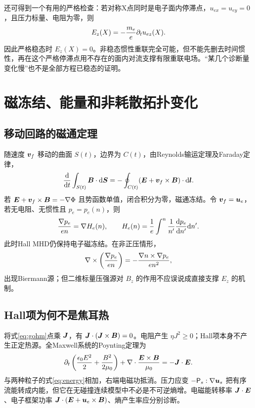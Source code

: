 还可得到一个有用的严格检查：若对称X点同时是电子面内停滞点，$u_{ex}=u_{ey}=0$，且压力标量、电阻为零，则
\begin{equation}E_z(X)=-{m_e\over e}\partial_tu_{ez}(X).
\end{equation}
因此严格稳态时 $E_z(X)=0$。非稳态惯性重联完全可能，但不能先删去时间惯性，再在这个严格停滞点用不存在的面内对流支撑有限重联电场。“某几个诊断量变化慢”也不是全部方程已稳态的证明。



\section{磁冻结、能量和非耗散拓扑变化}
\subsection{移动回路的磁通定理}
随速度 $\bm{v}_f$ 移动的曲面 $S(t)$，边界为 $C(t)$，由Reynolds输运定理及Faraday定律，
\begin{equation}{\mathrm d\over\mathrm dt}\int_{S(t)}\bm{B}\cdot\mathrm d\bm{S}=-\oint_{C(t)}(\bm{E}+\bm{v}_f\times\bm{B})\cdot\mathrm d\bm{l}.\label{eq:flux}\end{equation}
若 $\bm{E}+\bm{v}_f\times\bm{B}=-\nabla\Phi$ 且势函数单值，闭合积分为零，磁通冻结。令 $\bm{v}_f=\bm{u}_e$，若无电阻、无惯性且 $p_e=p_e(n)$，则
\begin{equation}{\nabla p_e\over en}=\nabla H_e(n),\qquad H_e(n)={1\over e}\int^n{1\over n'}{\mathrm d p_e\over\mathrm d n'}\mathrm d n'.
\end{equation}
此时Hall MHD仍保持电子磁冻结。在非正压情形，
\begin{equation}\nabla\times\left({\nabla p_e\over en}\right)=-{\nabla n\times\nabla p_e\over en^2},
\end{equation}
出现Biermann源；但二维标量压强源对 $B_z$ 的作用不应误说成直接支撑 $E_z$ 的机制。

\subsection{Hall项为何不是焦耳热}
将式\eqref{eq:gohm}点乘 $\bm{J}$，有 $\bm{J}\cdot(\bm{J}\times\bm{B})=0$。电阻产生 $\eta J^2\ge0$；Hall项本身不产生正定热源。全Maxwell系统的Poynting定理为
\begin{equation}\partial_t\left({\epsilon_0E^2\over2}+{B^2\over2\mu_0}\right)+\nabla\cdot{\bm{E}\times\bm{B}\over\mu_0}=-\bm{J}\cdot\bm{E}.
\end{equation}
与两种粒子的式\eqref{eq:energy}相加，右端电磁功抵消。压力应变 $-\mathsf P_s:\nabla\bm{u}_s$ 把有序流能转成内能，但它在无碰撞连续模型中不必是不可逆熵增。电磁能转移率 $\bm{J}\cdot\bm{E}$、电子框架功率 $\bm{J}\cdot(\bm{E}+\bm{u}_e\times\bm{B})$、熵产生率应分别诊断。

